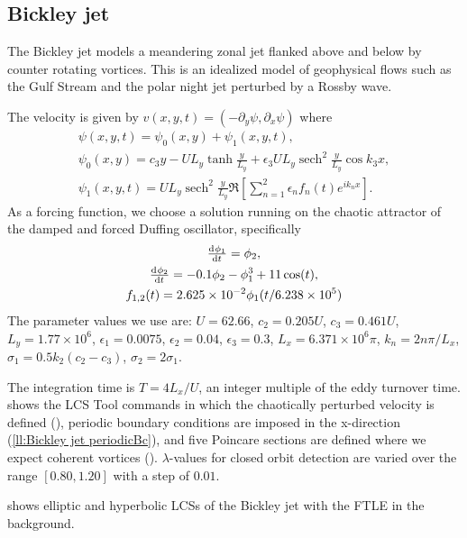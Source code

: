 \documentclass{article}
\DeclareMathOperator{\sech}{sech}
\begin{document}
\subsection{Bickley jet}

The Bickley jet models a meandering zonal jet flanked above and below by
counter rotating vortices. This is an idealized model of geophysical flows such as the Gulf Stream and the polar night jet perturbed by a Rossby wave\parencite{castilloNegrete93:_chaot_rossb,beron-vera10:_invar_lagran}.

The velocity is given by $v(x,y,t) = (-\partial_y \psi, \partial_x \psi)$ where
\begin{gather*}
\psi(x,y,t) = \psi_0(x,y) + \psi_1(x,y,t),\\
\psi_0(x,y) = c_3 y - U L_y \tanh\frac{y}{L_y} + \epsilon_3 U L_y \sech^2\frac{y}{L_y} \cos k_3 x,\\
\psi_1(x,y,t) = U L_y \sech^2\frac{y}{L_y} \Re\left[\sum_{n=1}^2 \epsilon_n f_n(t) e^{i k_n x}\right].
\end{gather*}
As a forcing function, we choose a solution running on the chaotic attractor of the damped and forced Duffing oscillator, specifically
\begin{gather*}
\od{\phi_1}{t} = \phi_2,\\
\od{\phi_2}{t} = -0.1 \phi_2 - \phi_1^3 + 11 \cos(t),\\
f_{1,2}(t) = 2.625 \times 10^{-2} \phi_1(t/6.238 \times 10^5)
\end{gather*}
The parameter values we use are: $U = 62.66$, $c_2 = 0.205 U$, $c_3 = 0.461 U$, $L_y = 1.77 \times 10^6$, $\epsilon_1 = 0.0075$, $\epsilon_2 = 0.04$, $\epsilon_3 = 0.3$, $L_x = 6.371 \times 10^6 \pi$, $k_n = 2 n \pi/L_x$, $\sigma_1 = 0.5 k_2 (c_2 - c_3)$, $\sigma_2 = 2 \sigma_1$.

The integration time is $T = 4L_x/U$, an integer multiple of the eddy turnover time.
 shows the LCS Tool commands in which the chaotically perturbed velocity is defined (), periodic boundary conditions are imposed in the x-direction (\cref{ll:Bickley jet periodicBc}), and five Poincare sections are defined where we expect coherent vortices ().
$\lambda$-values for closed orbit detection are varied over the range $[0.80,1.20]$ with a step of $0.01$.

 shows elliptic and hyperbolic LCSs of the Bickley jet with the FTLE in the background.
\end{document}
